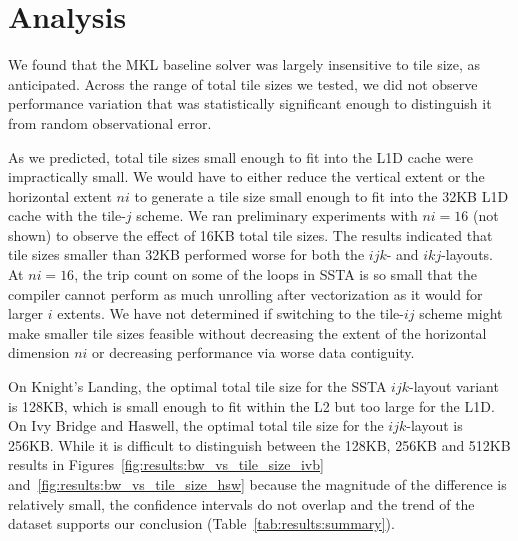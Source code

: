 \documentclass{sig-alternate}
\begin{document}
\section{Analysis}
\label{sec:results:analysis}

We found that the MKL baseline solver was largely insensitive to tile size, as
  anticipated.
Across the range of total tile sizes we tested, we did not observe performance
  variation that was statistically significant enough to distinguish it from
  random observational error.

As we predicted, total tile sizes small enough to fit into the L1D cache were
  impractically small.
We would have to either reduce the vertical extent or the horizontal
  extent \(ni\) to generate a tile size small enough to fit into the 32KB L1D
  cache with the tile-\(j\) scheme.
We ran preliminary experiments with \(ni=16\) (not shown) to observe the effect
  of 16KB total tile sizes.
The results indicated that tile sizes smaller than 32KB performed worse for both
  the \(ijk\)- and \(ikj\)-layouts.
At \(ni=16\), the trip count on some of the loops in SSTA is so small that the
  compiler cannot perform as much unrolling after vectorization as it would for
  larger \(i\) extents.
We have not determined if switching to the tile-\(ij\) scheme might make
  smaller tile sizes feasible without decreasing the extent of the horizontal
  dimension \(ni\) or decreasing performance via worse data contiguity.


On Knight's Landing, the optimal total tile size for the SSTA \(ijk\)-layout
  variant is 128KB, which is small enough to fit within the L2 but too large
  for the L1D. 
On Ivy Bridge and Haswell, the optimal total tile size for the \(ijk\)-layout 
  is 256KB.
While it is difficult to distinguish between the 128KB, 256KB and 512KB results
  in Figures~\ref{fig:results:bw_vs_tile_size_ivb} and~\ref{fig:results:bw_vs_tile_size_hsw}
  because the magnitude of the difference is relatively small, the confidence
  intervals do not overlap and the trend of the dataset supports our conclusion
  (Table~\ref{tab:results:summary}).
\end{document}
